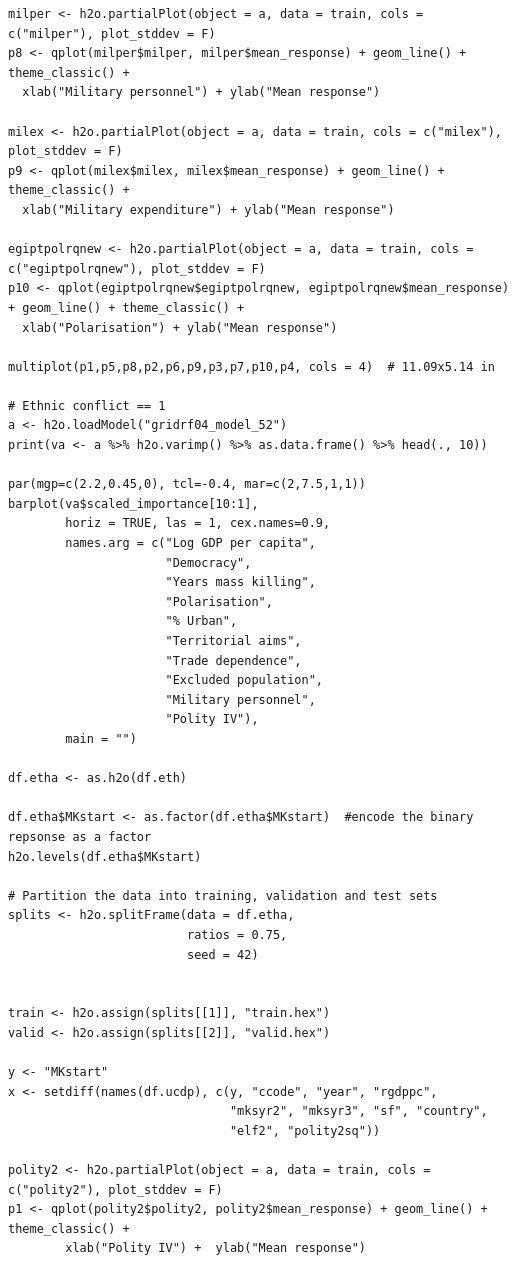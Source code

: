 \documentclass[a4paper,12pt]{article}
\begin{document}
\begin{verbatim}
milper <- h2o.partialPlot(object = a, data = train, cols = c("milper"), plot_stddev = F)
p8 <- qplot(milper$milper, milper$mean_response) + geom_line() + theme_classic() +
  xlab("Military personnel") + ylab("Mean response")

milex <- h2o.partialPlot(object = a, data = train, cols = c("milex"), plot_stddev = F)
p9 <- qplot(milex$milex, milex$mean_response) + geom_line() + theme_classic() +
  xlab("Military expenditure") + ylab("Mean response")

egiptpolrqnew <- h2o.partialPlot(object = a, data = train, cols = c("egiptpolrqnew"), plot_stddev = F)
p10 <- qplot(egiptpolrqnew$egiptpolrqnew, egiptpolrqnew$mean_response) + geom_line() + theme_classic() +
  xlab("Polarisation") + ylab("Mean response")

multiplot(p1,p5,p8,p2,p6,p9,p3,p7,p10,p4, cols = 4)  # 11.09x5.14 in

# Ethnic conflict == 1
a <- h2o.loadModel("gridrf04_model_52")
print(va <- a %>% h2o.varimp() %>% as.data.frame() %>% head(., 10)) 

par(mgp=c(2.2,0.45,0), tcl=-0.4, mar=c(2,7.5,1,1))
barplot(va$scaled_importance[10:1],
        horiz = TRUE, las = 1, cex.names=0.9,
        names.arg = c("Log GDP per capita",
                      "Democracy",
                      "Years mass killing",
                      "Polarisation",
                      "% Urban",
                      "Territorial aims", 
                      "Trade dependence",
                      "Excluded population",
                      "Military personnel",
                      "Polity IV"),
        main = "")

df.etha <- as.h2o(df.eth)

df.etha$MKstart <- as.factor(df.etha$MKstart)  #encode the binary repsonse as a factor
h2o.levels(df.etha$MKstart)

# Partition the data into training, validation and test sets
splits <- h2o.splitFrame(data = df.etha, 
                         ratios = 0.75, 
                         seed = 42)  


train <- h2o.assign(splits[[1]], "train.hex")   
valid <- h2o.assign(splits[[2]], "valid.hex") 

y <- "MKstart"
x <- setdiff(names(df.ucdp), c(y, "ccode", "year", "rgdppc",
                               "mksyr2", "mksyr3", "sf", "country",
                               "elf2", "polity2sq")) 

polity2 <- h2o.partialPlot(object = a, data = train, cols = c("polity2"), plot_stddev = F)
p1 <- qplot(polity2$polity2, polity2$mean_response) + geom_line() + theme_classic() + 
        xlab("Polity IV") +  ylab("Mean response")


\end{verbatim}
\end{document}
